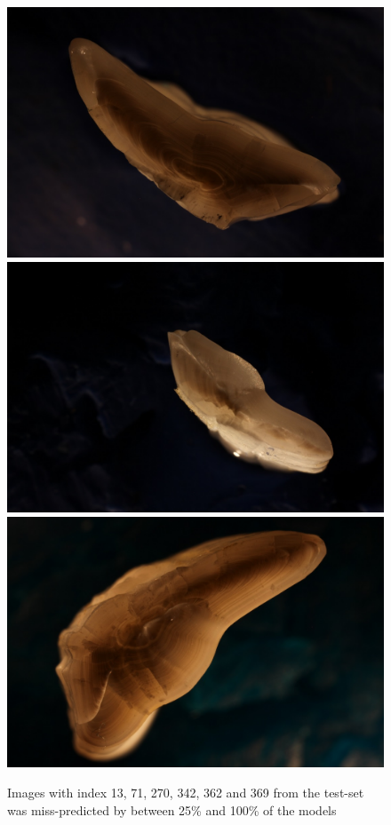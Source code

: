 \documentclass[10pt,letterpaper]{article}
\begin{document}
\begin{figure}[h!]
  \caption{Images with index 13, 71, 270, 342, 362 and 369 from the test-set
  was miss-predicted by between 25\% and 100\% of the models}
  \centering
  \includegraphics[scale=0.08]{outliers/IMG_0284_13.JPG}
  \includegraphics[scale=0.08]{outliers/IMG_0230_71.JPG}
  \includegraphics[scale=0.08]{outliers/IMG_0104_270.JPG} 


\end{figure}
\end{document}
